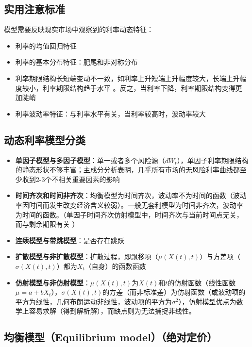 \documentclass[11pt]{article}
\begin{document}
\subsection{实用注意标准}

模型需要反映现实市场中观察到的利率动态特征：
\begin{itemize}
    \item 利率的均值回归特征
    \item 利率的基本分布特征：肥尾和非对称分布
    \item 利率期限结构长短端变动不一致，如利率上升短端上升幅度较大，长端上升幅度较小，利率期限结构趋于水平 。反之，当利率下降，利率期限结构变得更加陡峭
    \item 利率波动率特征：与利率水平有关，当利率较高时，波动率较大
\end{itemize}

\subsection{动态利率模型分类}

\begin{itemize}
    \item \textbf{单因子模型与多因子模型}：单一或者多个风险源（$dW_t$），单因子利率期限结构的静态形状不够丰富；主成分分析表明，几乎所有市场的无风险利率曲线都至少收到2-3个不相关重要因素的影响
    \item \textbf{时间齐次和时间非齐次}：均衡模型为时间齐次，波动率不为时间的函数（波动率因时间而发生改变经济含义较弱）。一般无套利模型为时间非齐次，波动率为时间的函数。（单因子时间齐次仿射模型中，时间齐次与当前时间点无关，而与剩余期限有关 ）
    \item \textbf{连续模型与带跳模型}：是否存在跳跃
    \item \textbf{扩散模型与非扩散模型}：扩散过程，即飘移项（$\mu(X(t),t)$）与方差项（$\sigma(X(t),t)$）都为$X_t$（自身）的函数函数
    \item \textbf{仿射模型与非仿射模型}：$\mu(X(t),t)$为$X(t)$和$t$的仿射函数（线性函数$\mu=a+bX_t$），$\sigma(X(t),t)$的方差（而非标准差）为仿射函数（或波动项的平方为线性，几何布朗运动非线性，波动项的平方为$\sigma^2$），仿射模型优点为数学上容易求解（得到解析解），而缺点则为无法捕捉非线性。
\end{itemize}

\subsection{均衡模型（Equilibrium model）（绝对定价）}
\end{document}

